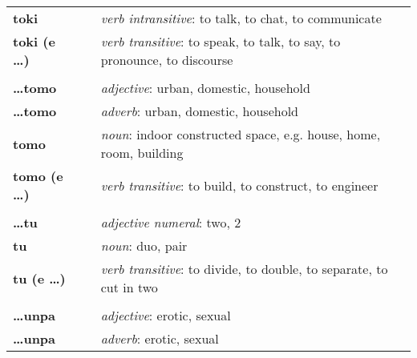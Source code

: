 \begin{supertabular}{p{2,5cm}|ll}
    \textbf{toki}                &  & \textit{verb intransitive}: to talk, to chat, to communicate                                               \\
    \textbf{toki (e \dots)}      &  & \textit{verb transitive}: to speak, to talk, to say, to pronounce, to discourse                            \\
                                 &  &                                                                                                            \\
    \textbf{\dots tomo}          &  & \textit{adjective}: urban, domestic, household                                                             \\
    \textbf{\dots tomo}          &  & \textit{adverb}: urban, domestic, household                                                                \\
    \textbf{tomo}                &  & \textit{noun}: indoor constructed space, e.g. house, home, room, building                                  \\
    \textbf{tomo (e \dots)}      &  & \textit{verb transitive}: to build, to construct, to engineer                                              \\
                                 &  &                                                                                                            \\
    \textbf{\dots tu}            &  & \textit{adjective numeral}: two, 2                                                                         \\
    \textbf{tu}                  &  & \textit{noun}: duo, pair                                                                                   \\
    \textbf{tu (e \dots)}        &  & \textit{verb transitive}: to divide, to double, to separate, to cut in two                                 \\
                                 &  &                                                                                                            \\
    \textbf{\dots unpa}          &  & \textit{adjective}: erotic, sexual                                                                         \\
    \textbf{\dots unpa}          &  & \textit{adverb}: erotic, sexual                                                                            \\

\end{supertabular}
